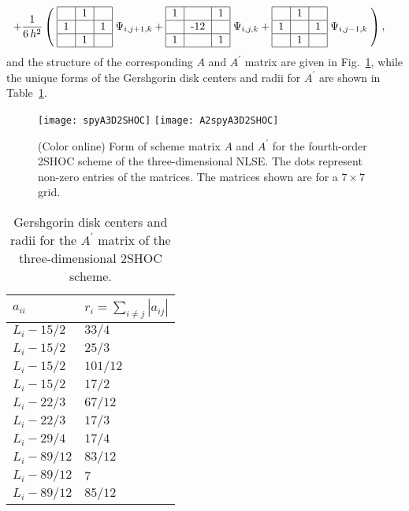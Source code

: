 \documentclass{article}
\begin{document}
\begin{alignat}{5}
&\begin{tabular}{l}
$+ \dfrac{1}{6\,h^2}\left(\;
\begin{tabular}{|c|c|c|} \hline
  & 1 &   \\ \hline
1 &   & 1 \\ \hline
  & 1 &   \\ \hline
\end{tabular} 
\;\Psi_{i,j+1,k} +
\begin{tabular}{|c|c|c|} \hline
1 &     & 1  \\ \hline
  & -12 &    \\ \hline
1 &     & 1  \\ \hline
\end{tabular}
\;\Psi_{i,j,k} +
\begin{tabular}{|c|c|c|} \hline
  & 1 &   \\ \hline
1 &   & 1 \\ \hline
  & 1 &   \\ \hline
\end{tabular}
\;\Psi_{i,j-1,k} \; \right),$
\end{tabular} \notag
\end{alignat}
and the structure of the corresponding $A$ and $A^{\prime}$ matrix are given in Fig.~\ref{f:A3D2SHOC}, while the unique forms of the Gershgorin disk centers and radii for $A^{\prime}$ are shown in Table~\ref{t:3d2shocgd}.
\begin{figure}[htbp]
\centering
\texttt{[image: spyA3D2SHOC]}
\texttt{[image: A2spyA3D2SHOC]}
\caption{(Color online) Form of scheme matrix $A$ and $A^{\prime}$ for the fourth-order 2SHOC scheme of the three-dimensional NLSE.  The dots represent non-zero entries of the matrices.  The matrices shown are for a $7 \times 7$ grid. \label{f:A3D2SHOC}}
\end{figure}
\begin{table}[htbp] 
\centering 
\caption{Gershgorin disk centers and radii for the $A^{\prime}$ matrix of the three-dimensional 2SHOC scheme.}
\begin{center}
\begin{tabular}{|l|l|} \hline
$a_{ii}$    & $r_i = \sum_{i\ne j} |a_{ij}|$ \\ \hline
$L_i - 15/2$   & $33/4$ \\
$L_i - 15/2$   & $25/3$ \\
$L_i - 15/2$   & $101/12$ \\
$L_i - 15/2$   & $17/2$ \\
$L_i - 22/3$   & $67/12$ \\
$L_i - 22/3$   & $17/3$ \\
$L_i - 29/4$   & $17/4$ \\
$L_i - 89/12$  & $83/12$ \\
$L_i - 89/12$  & $7$ \\
$L_i - 89/12$  & $85/12$ \\
\hline
\end{tabular}
\end{center}
\label{t:3d2shocgd}
\end{table}
\end{document}
